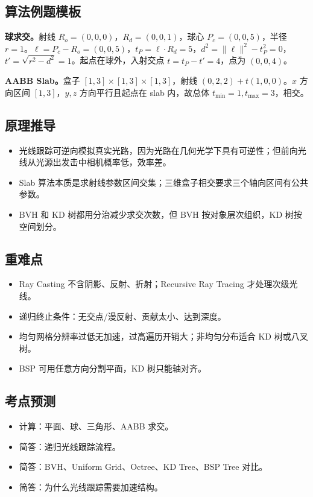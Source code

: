 \documentclass[UTF8,zihao=-4,scheme=chinese,fontset=fandol]{ctexart}
\begin{document}
\subsection{算法例题模板}
\textbf{球求交。}射线 $R_o=(0,0,0)$，$R_d=(0,0,1)$，球心 $P_c=(0,0,5)$，半径 $r=1$。$\ell=P_c-R_o=(0,0,5)$，$t_P=\ell\cdot R_d=5$，$d^2=\|\ell\|^2-t_P^2=0$，$t'=\sqrt{r^2-d^2}=1$。起点在球外，入射交点 $t=t_P-t'=4$，点为 $(0,0,4)$。

\textbf{AABB Slab。}盒子 $[1,3]\times[1,3]\times[1,3]$，射线 $(0,2,2)+t(1,0,0)$。$x$ 方向区间 $[1,3]$，$y,z$ 方向平行且起点在 slab 内，故总体 $t_{\min}=1,t_{\max}=3$，相交。

\subsection{原理推导}
\begin{itemize}
  \item 光线跟踪可逆向模拟真实光路，因为光路在几何光学下具有可逆性；但前向光线从光源出发击中相机概率低，效率差。
  \item Slab 算法本质是求射线参数区间交集；三维盒子相交要求三个轴向区间有公共参数。
  \item BVH 和 KD 树都用分治减少求交次数，但 BVH 按对象层次组织，KD 树按空间划分。
\end{itemize}

\subsection{重难点}
\begin{itemize}
  \item Ray Casting 不含阴影、反射、折射；Recursive Ray Tracing 才处理次级光线。
  \item 递归终止条件：无交点/漫反射、贡献太小、达到深度。
  \item 均匀网格分辨率过低无加速，过高遍历开销大；非均匀分布适合 KD 树或八叉树。
  \item BSP 可用任意方向分割平面，KD 树只能轴对齐。
\end{itemize}

\subsection{考点预测}
\begin{itemize}
  \item 计算：平面、球、三角形、AABB 求交。
  \item 简答：递归光线跟踪流程。
  \item 简答：BVH、Uniform Grid、Octree、KD Tree、BSP Tree 对比。
  \item 简答：为什么光线跟踪需要加速结构。
\end{itemize}
\end{document}

